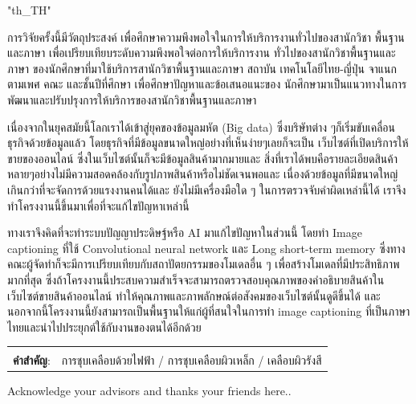 \documentclass[12pt,oneside,openright,a4paper]{cpe-english-project}
\begin{document}
{
\XeTeXlinebreaklocale "th_TH"	
\thaifont
\thaiabstract

การวิจัยครั้งนี้มีวัตถุประสงค์  เพื่อศึกษาความพึงพอใจในการให้บริการงานทั่วไปของสานักวิชา พื้นฐานและภาษา เพื่อเปรียบเทียบระดับความพึงพอใจต่อการให้บริการงาน ทั่วไปของสานักวิชาพื้นฐานและภาษา ของนักศึกษาที่มาใช้บริการสานักวิชาพื้นฐานและภาษา สถาบัน เทคโนโลยีไทย-ญี่ปุ่น จาแนกตามเพศ คณะ และชั้นปีที่ศึกษา เพื่อศึกษาปัญหาและข้อเสนอแนะของ นักศึกษามาเป็นแนวทางในการพัฒนาและปรับปรุงการให้บริการของสานักวิชาพื้นฐานและภาษา

เนื่องจากในยุคสมัยนี้โลกเราได้เข้าสู่ยุคของข้อมูลมหัต (Big data) ซึ่งบริษัทต่าง ๆก็เริ่มขับเคลื่อนธุรกิจด้วยข้อมูลแล้ว  โดยธุรกิจที่มีข้อมูลขนาดใหญ่อย่างที่เห็นง่ายๆเลยก็จะเป็น เว็บไซต์ที่เปิดบริการให้ขายของออนไลน์ ซึ่งในเว็บไซต์นั้นก็จะมีข้อมูลสินค้ามากมายและ สิ่งที่เราได้พบคือรายละเอียดสินค้าหลายๆอย่างไม่มีความสอดคล้องกับรูปภาพสินค้าหรือไม่ชัดเจนพอและ เนื่องด้วยข้อมูลที่มีขนาดใหญ่เกินกว่าที่จะจัดการด้วยแรงงานคนได้และ ยังไม่มีเครื่องมือใด ๆ ในการตรวจจับคำผิดเหล่านี้ได้ เราจึงทำโครงงานนี้ขึ้นมาเพื่อที่จะแก้ไขปัญหาเหล่านี้\par
ทางเราจึงคิดที่จะทำระบบปัญญาประดิษฐ์หรือ AI มาแก้ไขปัญหาในส่วนนี้ โดยทำ Image captioning ที่ใช้ Convolutional neural network และ Long short-term memory ซึ่งทางคณะผู้จัดทำก็จะมีการเปรียบเทียบกับสถาปัตยกรรมของโมเดลอื่น ๆ เพื่อสร้างโมเดลที่มีประสิทธิภาพมากที่สุด ซึ่งถ้าโครงงานนี้ประสบความสำเร็จจะสามารถตรวจสอบคุณภาพของคำอธิบายสินค้าในเว็บไซต์ขายสินค้าออนไลน์ ทำให้คุณภาพและภาพลักษณ์ต่อสังคมของเว็บไซต์นั้นดูดีขึ้นได้ และนอกจากนี้โครงงานนี้ยังสามารถเป็นพื้นฐานให้แก่ผู้ที่สนใจในการทำ image captioning ที่เป็นภาษาไทยและนำไปประยุกต์ใช้กับงานของตนได้อีกด้วย 

\begin{flushleft}
\begin{tabular*}{\textwidth}{@{}lp{}}
 & \\

\textbf{คำสำคัญ}: & การชุบเคลือบด้วยไฟฟ้า / การชุบเคลือบผิวเหล็ก /  เคลือบผิวรังสี
\end{tabular*}
\end{flushleft}
\endabstract
}

\preface
Acknowledge your advisors and thanks your friends here..
\end{document}

